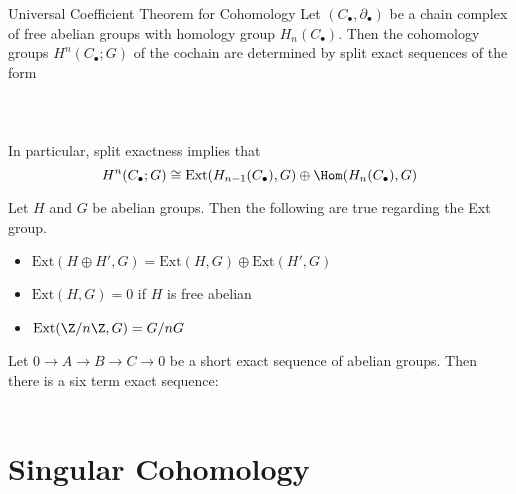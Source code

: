 \documentclass[a4paper]{article}
\begin{document}
\begin{thm}{Universal Coefficient Theorem for Cohomology}{} Let $(C_\bullet,\partial_\bullet)$ be a chain complex of free abelian groups with homology group $H_n(C_\bullet)$. Then the cohomology groups $H^n(C_\bullet;G)$ of the cochain are determined by split exact sequences of the form \\~\\
\\~\\
In particular, split exactness implies that $$H^n(C_\bullet;G)\cong\text{Ext}(H_{n-1}(C_\bullet),G)\oplus\Hom(H_n(C_\bullet),G)$$
\end{thm}

\begin{prp}{}{} Let $H$ and $G$ be abelian groups. Then the following are true regarding the Ext group. 
\begin{itemize}
\item $\text{Ext}(H\oplus H',G)=\text{Ext}(H,G)\oplus\text{Ext}(H',G)$
\item $\text{Ext}(H,G)=0$ if $H$ is free abelian
\item $\text{Ext}(\Z/n\Z,G)=G/nG$
\end{itemize}
\end{prp}

\begin{prp}{}{} Let $0\to A\to B\to C\to 0$ be a short exact sequence of abelian groups. Then there is a six term exact sequence: \\~\\
\end{prp}

\pagebreak
\section{Singular Cohomology}
\end{document}

